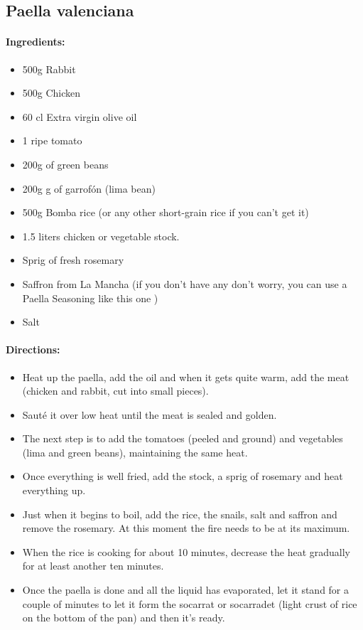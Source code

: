 \documentclass{article}
\begin{document}
\subsection{Paella valenciana}

\paragraph{Ingredients:}

\begin{itemize}
	\item 500g Rabbit
	\item 500g Chicken
	\item 60 cl Extra virgin olive oil
	\item 1 ripe tomato
	\item 200g of green beans
	\item 200g g of garrofón (lima bean)
	\item 500g Bomba rice (or any other short-grain rice if you can’t get it)
	\item 1.5 liters chicken or vegetable stock.
	\item Sprig of fresh rosemary
	\item Saffron from La Mancha (if you don’t have any don’t worry, you can use a Paella Seasoning like this one )
	\item Salt
\end{itemize}

\paragraph{Directions:}
\begin{itemize}
	\item Heat up the paella, add the oil and when it gets quite warm, add the meat (chicken and rabbit, cut into small pieces).
	\item Sauté it over low heat until the meat is sealed and golden.
	\item The next step is to add the tomatoes (peeled and ground) and vegetables (lima and green beans), maintaining the same heat.
	\item Once everything is well fried, add the stock, a sprig of rosemary and heat everything up.
	\item Just when it begins to boil, add the rice, the snails, salt and saffron and remove the rosemary. At this moment the fire needs to be at its maximum.
	\item When the rice is cooking for about 10 minutes, decrease the heat gradually for at least another ten minutes.
	\item Once the paella is done and all the liquid has evaporated, let it stand for a couple of minutes to let it form the socarrat or socarradet (light crust of rice on the bottom of the pan) and then it’s ready.
\end{itemize}
\end{document}
